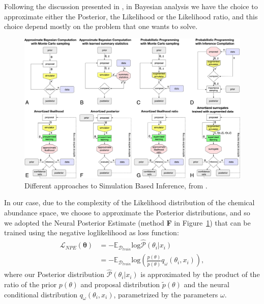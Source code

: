 Following the discussion presented in \cite{hoLtUILIAllinOneFramework2024}, in Bayesian analysis we have the choice to approximate either the Posterior, the Likelihood or the Likelihood ratio, and this choice depend mostly on the problem that one wants to solve. 
\begin{figure}[ht]
    \centering
    \includegraphics[width=1\textwidth]{./figure/sbi_methods.jpg}
    \caption{Different approaches to Simulation Based Inference, from \cite{FrontierSimulationbasedInference}.}
    \label{fig:sbi_approaches}
\end{figure}

In our case, due to the complexity of the Likelihood distribution of the chemical abundance space, we choose to approximate the Posterior distributions, and so we adopted the Neural Posterior Estimate (method \textbf{F} in Figure~\ref{fig:sbi_approaches}) that can be trained using the negative loglikelihood as loss function:
\begin{equation}
\begin{aligned}
    \mathcal{L}_{NPE}(\boldsymbol{\theta}) &= - \mathbb{E}_{\mathcal{D}_{train}} \text{log} \hat{\mathcal{P}}(\theta_i | x_i) \\ 
    &= - \mathbb{E}_{\mathcal{D}_{train}} \text{log} \left( \frac{p(\theta)}{\tilde{p}(\theta)} q_{\omega}(\theta_i, x_i) \right), 
\end{aligned}
\end{equation}
where our Posterior distribution $ \hat{\mathcal{P}}(\theta_i | x_i)$ is approximated by the product of the ratio of the prior $p(\theta)$ and proposal distribution $\tilde{p}(\theta)$ and the neural conditional distribution $q_{\omega}(\theta_i, x_i)$, parametrized by the parameters $\omega$. 


